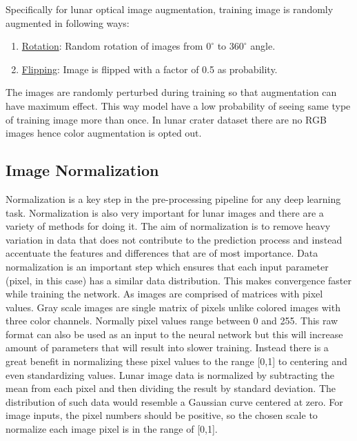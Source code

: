 \documentclass[11pt]{article}
\begin{document}
Specifically for lunar optical image augmentation, training image is randomly augmented in following ways:

\begin{enumerate}
	\item \underline{Rotation}: Random rotation of images from $0^{\circ}$ to $360^{\circ}$ angle.
	\item \underline{Flipping}: Image is flipped with a factor of 0.5 as probability. 
\end{enumerate}

The images are randomly perturbed during training so that augmentation can have maximum effect. This way model have a low probability of seeing same type of training image more than once. In lunar crater dataset there are no RGB images hence color augmentation is opted out.

\subsection{Image Normalization}
Normalization is a key step in the pre-processing pipeline for any deep learning task. Normalization is also very important for lunar images and there are a variety of methods for doing it. The aim of normalization is to remove heavy variation in data that does not contribute to the prediction process and instead accentuate the features and differences that
are of most importance. Data normalization is an important step which ensures that each input parameter (pixel, in this case) has a similar data distribution. This makes convergence faster while training the network. As images are comprised of matrices with pixel values. Gray scale images are single matrix of pixels unlike colored images with three color channels. Normally pixel values range between 0 and 255. This raw format can also be used as an input to the neural network but this will increase amount of parameters that will result into slower training. Instead there is a great benefit in normalizing these pixel values to the range [0,1] to centering and even standardizing values. Lunar image data is normalized by subtracting the mean from each pixel and then dividing the result by standard deviation. The distribution of such data would resemble a Gaussian curve centered at zero. For image inputs, the pixel numbers should be positive, so the chosen scale to normalize each image pixel is in the range of [0,1]. 
\end{document}
